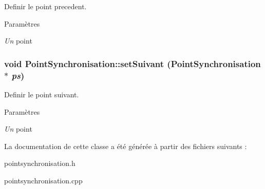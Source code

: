 Definir le point precedent. 


\begin{DoxyParams}{Paramètres}
\item[{\em Un}]point \end{DoxyParams}
\hypertarget{classPointSynchronisation_a8f677010a6ec932eba3b15a586c575ad}{
\subsubsection[{setSuivant}]{\setlength{\rightskip}{0pt plus 5cm}void PointSynchronisation::setSuivant ({\bf PointSynchronisation} $\ast$ {\em ps})}}
\label{classPointSynchronisation_a8f677010a6ec932eba3b15a586c575ad}


Definir le point suivant. 


\begin{DoxyParams}{Paramètres}
\item[{\em Un}]point \end{DoxyParams}


La documentation de cette classe a été générée à partir des fichiers suivants :\begin{DoxyCompactItemize}
\item 
pointsynchronisation.h\item 
pointsynchronisation.cpp\end{DoxyCompactItemize}
